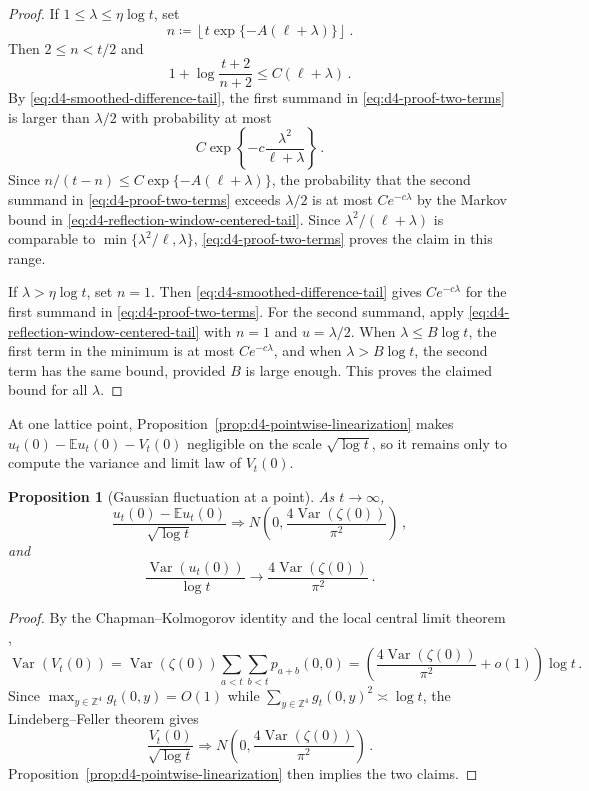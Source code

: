 \documentclass[11pt]{amsart}
\theoremstyle{plain}
\newtheorem{proposition}[theorem]{Proposition}
\theoremstyle{definition}
\newcommand{\Z}{\mathbb{Z}}
\newcommand{\E}{\mathbb{E}}
\DeclareMathOperator{\Var}{Var}
\begin{document}
\begin{proof}
			If $1\leq\lambda\leq \eta\log t$, set
			\[
				n\coloneqq\left\lfloor t\exp\{-A(\ell+\lambda)\}\right\rfloor\, .
			\]
			Then $2\leq n<t/2$ and
			\[
				1+\log\frac{t+2}{n+2}\leq C(\ell+\lambda)\, .
			\]
			By \eqref{eq:d4-smoothed-difference-tail}, the first summand in
			\eqref{eq:d4-proof-two-terms} is larger than $\lambda/2$ with
			probability at most
			\[
				C\exp\left\{
				-c\frac{\lambda^2}{\ell+\lambda}
				\right\}\, .
			\]
			Since $n/(t-n)\leq C\exp\{-A(\ell+\lambda)\}$, the probability that the second summand in \eqref{eq:d4-proof-two-terms} exceeds $\lambda/2$ is at most $Ce^{-c\lambda}$ by the Markov bound in
			\eqref{eq:d4-reflection-window-centered-tail}. Since
			$\lambda^2/(\ell+\lambda)$ is comparable to
			$\min\{\lambda^2/\ell,\lambda\}$, \eqref{eq:d4-proof-two-terms} proves the claim in this range.
 
			If $\lambda>\eta\log t$, set $n=1$. Then
			\eqref{eq:d4-smoothed-difference-tail} gives $Ce^{-c\lambda}$ for the
			first summand in \eqref{eq:d4-proof-two-terms}. For the second
			summand, apply \eqref{eq:d4-reflection-window-centered-tail} with $n=1$ and $u=\lambda/2$. When $\lambda\leq B\log t$, the first term in the minimum is at most $Ce^{-c\lambda}$, and when $\lambda>B\log t$, the second term has the same bound, provided $B$ is large enough. This proves
			the claimed bound for all $\lambda$.
		\end{proof}

		At one lattice point, Proposition~\ref{prop:d4-pointwise-linearization}
		makes $u_t(0)-\E u_t(0)-V_t(0)$ negligible on the scale
		$\sqrt{\log t}$, so it remains only to compute the variance and limit
		law of $V_t(0)$.

		\begin{proposition}[Gaussian fluctuation at a point]\label{prop:d4-one-point-gaussian}
			As $t\to\infty$,
			\[
				\frac{u_t(0)-\E u_t(0)}{\sqrt{\log t}}
				\Longrightarrow
				N\left(0,\frac{4\Var(\zeta(0))}{\pi^2}\right)\, ,
			\]
			and
			\[
				\frac{\Var(u_t(0))}{\log t}
				\longrightarrow
				\frac{4\Var(\zeta(0))}{\pi^2}\, .
			\]
		\end{proposition}

		\begin{proof}
			By the Chapman--Kolmogorov identity and the local central limit theorem
			\citep[Theorem~2.1.3]{LawlerLimic},
			\[
				\Var(V_t(0))
				=
				\Var(\zeta(0))\sum_{a<t}\sum_{b<t}p_{a+b}(0,0)
				=
				\left(\frac{4\Var(\zeta(0))}{\pi^2}+o(1)\right)\log t\, .
			\]
			Since $\max_{y\in\Z^4} g_t(0,y)=O(1)$ while
			$\sum_{y\in\Z^4} g_t(0,y)^2\asymp\log t$, the Lindeberg--Feller theorem gives
			\[
				\frac{V_t(0)}{\sqrt{\log t}}
				\Longrightarrow
				N\left(0,\frac{4\Var(\zeta(0))}{\pi^2}\right)\, .
			\]
			Proposition~\ref{prop:d4-pointwise-linearization} then implies the two claims.
		\end{proof}
\end{document}
